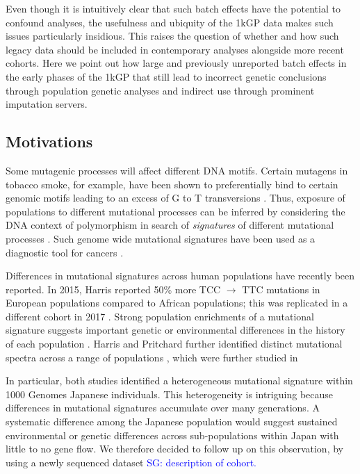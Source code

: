 \documentclass[9pt,lineno]{elife}
\newcommand{\sgcomment}[1]{\textcolor{blue}{SG: #1}}
\begin{document}
Even though it is intuitively clear that such batch effects have the potential to confound analyses, the usefulness and ubiquity of the 1kGP data makes such issues particularly insidious.   This raises the question of whether and how such legacy data should be included in contemporary analyses alongside more recent cohorts. 
Here we point out how large and previously unreported batch effects in the early phases of the 1kGP that still lead to incorrect genetic conclusions through population genetic analyses and indirect use through prominent imputation servers.  

\subsection{Motivations}

Some mutagenic processes will affect different DNA motifs. 
Certain mutagens in tobacco smoke, for example, have been shown to preferentially bind to certain genomic motifs leading to an excess of G to T transversions \citep{Pfeifer2002,Pleasance2010}. 
Thus, exposure of populations to different mutational processes can be inferred by considering the DNA context of polymorphism in search of \textit{signatures} of different mutational processes \citep{Alexandrov2013,Shiraishi2015a}. 
Such genome wide mutational signatures have been used as a diagnostic tool for cancers \citep{Alexandrov2013,Shiraishi2015a}.


Differences in mutational signatures across human populations have recently been reported.
In 2015, Harris reported 50\% more TCC ${\rightarrow}$ TTC mutations in European populations compared to African populations; this was replicated in a different cohort in 2017 \citep{Harris2015a, Harris2017a, Mathieson2017a}. 
Strong population enrichments of a mutational signature suggests important genetic or environmental differences in the history of each population \citep{Harris2015a, Harris2017a}. 
Harris and Pritchard further identified distinct mutational spectra across a range of populations \citep{Harris2017a}, which were further studied in \citep{Aikens2018}
 
 In particular, both studies  identified a heterogeneous mutational signature within 1000 Genomes Japanese individuals.
This heterogeneity is intriguing because differences in mutational signatures accumulate over many generations.
A systematic difference among the Japanese population would suggest sustained environmental or genetic differences across sub-populations within Japan with little to no gene flow.
We therefore decided to follow up on this observation, by using a newly sequenced dataset \sgcomment{description of cohort.}
\end{document}
